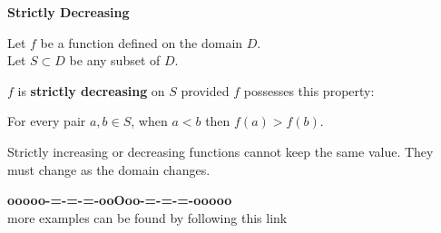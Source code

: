 \documentclass{ximera}
\begin{document}
\begin{definition} \textbf{\textcolor{green!50!black}{Strictly Decreasing}} 


Let $f$ be a function defined on the domain $D$. \\
Let $S \subset D$ be any subset of $D$.

$f$ is \textbf{strictly decreasing} on $S$ provided $f$ possesses this property:  


\begin{center}
For every pair $a, b \in S$, when $a < b$ then $f(a) > f(b)$.
\end{center}

\end{definition}




Strictly increasing or decreasing functions cannot keep the same value.  They must change as the domain changes.











\begin{onlineOnly}
\begin{center}
\textbf{\textcolor{green!50!black}{ooooo-=-=-=-ooOoo-=-=-=-ooooo}} \\

more examples can be found by following this link\\ 

\end{center}
\end{onlineOnly}
\end{document}
